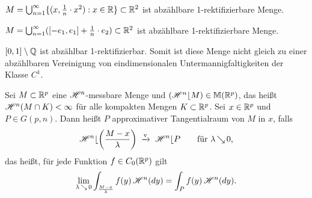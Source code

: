 \documentclass[a4paper,twoside,DIV15,BCOR12mm]{scrbook}
\newcommand{\HM}{\H}
\DeclareMathOperator{\downto}{\searrow}
\newcommand{\MR}{\lfloor}
\begin{document}
\begin{beispiele}
\item $M = \bigcup_{n=1}^\infty \{(x,\frac 1n \cdot x^2) : x\in \mathbb{R}\} \subset \mathbb{R}^2$ ist abzählbare 1-rektifizierbare Menge.
\item $M = \bigcup_{n=1}^\infty ([-e_1, e_1] + \frac 1n \cdot e_2) \subset \mathbb{R}^2$ ist abzählbare 1-rektifizierbare Menge.
\item $[0,1]\setminus \mathbb{Q} $ ist abzählbar 1-rektifizierbar. Somit ist diese Menge nicht gleich zu einer 
abzählbaren Vereinigung von eindimensionalen Untermannigfaltigkeiten der Klasse $C^1$.
\end{beispiele}

\begin{definition}
Sei $M\subset \mathbb{R}^p$ eine $\HM^n$-messbare Menge und $(\HM^n\MR M)\in \mathbb M(\MdR^p)$, das heißt $\HM^n(M\cap K) < \infty$ für alle kompakten Mengen $K\subset \mathbb{R}^p$. Sei $x\in\mathbb{R}^p$ und $P\in G(p,n)$. Dann heißt $P$ approximativer Tangentialraum von $M$ in $x$, falls
\[
\HM^n\MR \left(\frac{M-x}{\lambda}\right) \tonach{v} \HM^n\MR P\qquad \text{für $\lambda \downto0$,}
\]
das heißt, für jede Funktion $f\in C_0(\mathbb{R}^p)$ gilt
\[
\lim_{\lambda \downto0} \int_{\frac{M-x}\lambda} f(y)\, \HM^n(dy) = \int_P f(y) \,\HM^n(dy).
\]
\end{definition}
\end{document}
